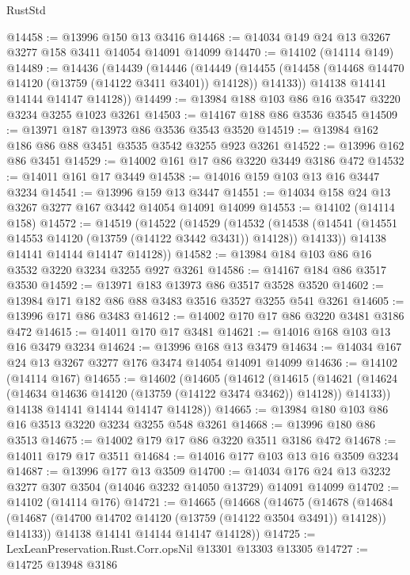 \begin{lexlean}{RustStd}
\begin{coremodule}
@14458 := @13996 @150 @13 @3416
@14468 := @14034 @149 @24 @13 @3267 @3277 @158 @3411 @14054 @14091 @14099
@14470 := @14102 (@14114 @149)
@14489 := @14436
    (@14439
      (@14446
        (@14449
          (@14455 (@14458 (@14468 @14470 @14120 (@13759 (@14122 @3411 @3401)) @14128)) @14133))
        @14138
        @14141
        @14144
        @14147
        @14128))
@14499 := @13984 @188 @103 @86 @16 @3547 @3220 @3234 @3255 @1023 @3261
@14503 := @14167 @188 @86 @3536 @3545
@14509 := @13971 @187 @13973 @86 @3536 @3543 @3520
@14519 := @13984 @162 @186 @86 @88 @3451 @3535 @3542 @3255 @923 @3261
@14522 := @13996 @162 @86 @3451
@14529 := @14002 @161 @17 @86 @3220 @3449 @3186 @472
@14532 := @14011 @161 @17 @3449
@14538 := @14016 @159 @103 @13 @16 @3447 @3234
@14541 := @13996 @159 @13 @3447
@14551 := @14034 @158 @24 @13 @3267 @3277 @167 @3442 @14054 @14091 @14099
@14553 := @14102 (@14114 @158)
@14572 := @14519
    (@14522
      (@14529
        (@14532
          (@14538 (@14541 (@14551 @14553 @14120 (@13759 (@14122 @3442 @3431)) @14128)) @14133))
        @14138
        @14141
        @14144
        @14147
        @14128))
@14582 := @13984 @184 @103 @86 @16 @3532 @3220 @3234 @3255 @927 @3261
@14586 := @14167 @184 @86 @3517 @3530
@14592 := @13971 @183 @13973 @86 @3517 @3528 @3520
@14602 := @13984 @171 @182 @86 @88 @3483 @3516 @3527 @3255 @541 @3261
@14605 := @13996 @171 @86 @3483
@14612 := @14002 @170 @17 @86 @3220 @3481 @3186 @472
@14615 := @14011 @170 @17 @3481
@14621 := @14016 @168 @103 @13 @16 @3479 @3234
@14624 := @13996 @168 @13 @3479
@14634 := @14034 @167 @24 @13 @3267 @3277 @176 @3474 @14054 @14091 @14099
@14636 := @14102 (@14114 @167)
@14655 := @14602
    (@14605
      (@14612
        (@14615
          (@14621 (@14624 (@14634 @14636 @14120 (@13759 (@14122 @3474 @3462)) @14128)) @14133))
        @14138
        @14141
        @14144
        @14147
        @14128))
@14665 := @13984 @180 @103 @86 @16 @3513 @3220 @3234 @3255 @548 @3261
@14668 := @13996 @180 @86 @3513
@14675 := @14002 @179 @17 @86 @3220 @3511 @3186 @472
@14678 := @14011 @179 @17 @3511
@14684 := @14016 @177 @103 @13 @16 @3509 @3234
@14687 := @13996 @177 @13 @3509
@14700 := @14034 @176 @24 @13 @3232 @3277 @307 @3504 (@14046 @3232 @14050 @13729) @14091 @14099
@14702 := @14102 (@14114 @176)
@14721 := @14665
    (@14668
      (@14675
        (@14678
          (@14684 (@14687 (@14700 @14702 @14120 (@13759 (@14122 @3504 @3491)) @14128)) @14133))
        @14138
        @14141
        @14144
        @14147
        @14128))
@14725 := LexLeanPreservation.Rust.Corr.opsNil @13301 @13303 @13305
@14727 := @14725 @13948 @3186

\end{coremodule}
\end{lexlean}
